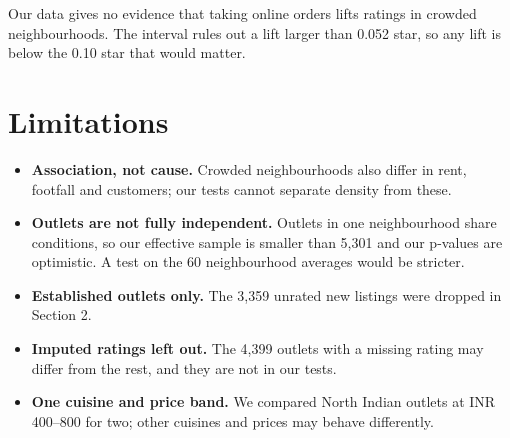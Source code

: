 \documentclass[10pt,a4paper,twocolumn]{article}
\newif\ifshowhints
\newcommand{\hint}[1]{\ifshowhints{\footnotesize\itshape\color{hintgrey}#1\par}\fi}
\newcommand{\eg}[1]{\textcolor{eg}{#1}}
\newcommand{\egblock}[1]{{\color{eg}#1\par}}
\begin{document}
\egblock{Our data gives no evidence that taking online orders lifts ratings in crowded
neighbourhoods. The interval rules out a lift larger than 0.052 star, so any lift is below the
0.10 star that would matter.}

\hint{Running a third test? Add it here as Test 3, with the same three parts: copy the Test 2
block.}

\section{Limitations}
\hint{What your analysis cannot show, and why: rows you dropped, assumptions that hold only
approximately, groups your conclusions do not cover, and association versus cause.}

\begin{itemize}
  \item \eg{\textbf{Association, not cause.} Crowded neighbourhoods also differ in rent, footfall
  and customers; our tests cannot separate density from these.}
  \item \eg{\textbf{Outlets are not fully independent.} Outlets in one neighbourhood share
  conditions, so our effective sample is smaller than 5{,}301 and our p-values are optimistic.
  A test on the 60 neighbourhood averages would be stricter.}
  \item \eg{\textbf{Established outlets only.} The 3{,}359 unrated new listings were dropped in
  Section 2.}
  \item \eg{\textbf{Imputed ratings left out.} The 4{,}399 outlets with a missing rating may
  differ from the rest, and they are not in our tests.}
  \item \eg{\textbf{One cuisine and price band.} We compared North Indian outlets at INR
  400--800 for two; other cuisines and prices may behave differently.}
\end{itemize}
\end{document}
